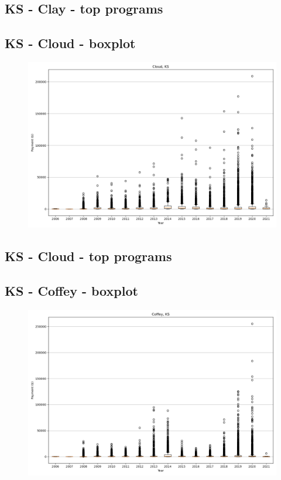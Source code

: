 \subsection*{KS - Clay - top programs}

\newpage
\subsection*{KS - Cloud - boxplot}
\begin{figure}[h]
\centering
\includegraphics[width=7in]{../output/boxplots/counties/Cloud-KS_boxplot.png}
\end{figure}


\subsection*{KS - Cloud - top programs}

\newpage
\subsection*{KS - Coffey - boxplot}
\begin{figure}[h]
\centering
\includegraphics[width=7in]{../output/boxplots/counties/Coffey-KS_boxplot.png}
\end{figure}


